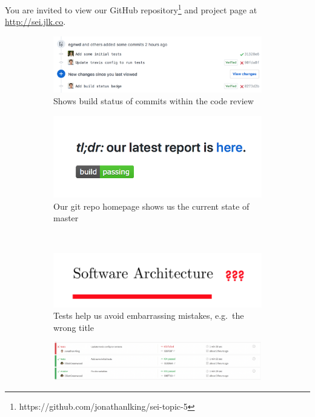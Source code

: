 You are invited to view our GitHub repository\footnote{https://github.com/jonathanlking/sei-topic-5} and project page at \url{http://sei.jlk.co}.

\begin{figure}[ht]
  \centering
  \begin{subfigure}[h]{0.4\linewidth}
    \centering
    \includegraphics[width=\linewidth]{ci-1.png}
    \caption{Shows build status of commits within the code review}
    \label{fig:ci-1}
  \end{subfigure}
  \hfill
  \begin{subfigure}[h]{0.4\linewidth}
    \centering
    \includegraphics[width=\linewidth]{ci-2.png}
    \caption{Our git repo homepage shows us the current state of master}
    \label{fig:ci-2}
  \end{subfigure}
  \\
  \begin{subfigure}[h]{0.4\linewidth}
    \centering
    \includegraphics[width=\linewidth]{ci-3.png}
    \caption{Tests help us avoid embarrassing mistakes, e.g.~the wrong title}
    \label{fig:ci-3}
  \end{subfigure}
  \hfill
  \begin{subfigure}[h]{0.4\linewidth}
    \centering
    \includegraphics[width=\linewidth]{ci-4.png}

\end{subfigure}
\end{figure}
